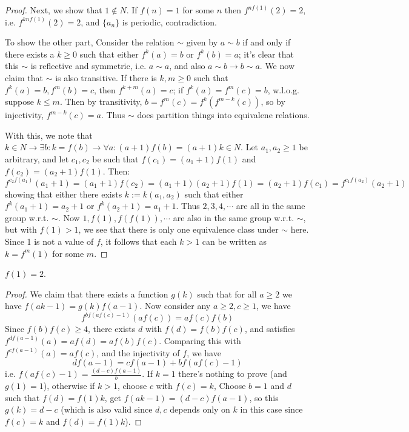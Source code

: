 \documentclass[11pt,a4paper]{article}
\begin{document}
\begin{enumerate}
    	\begin{proof}
    		Next, we show that $1\not\in N$. 
    		If $f(n)=1$ for some $n$ then $f^{nf(1)}(2)=2$, 
    		i.e. $f^{knf(1)}(2)=2$, and $\{a_n\}$ is periodic, contradiction. 
    		
    		To show the other part, 
    		Consider the relation $\sim$ given by $a\sim b$ if and only if there exists a $k\ge 0$ such that either $f^k(a)=b$ or $f^k(b) = a$; 
    		it's clear that this $\sim$ is reflective and symmetric, 
    		i.e. $a\sim a$, and also $a\sim b\to b\sim a$. 
    		We now claim that $\sim$ is also transitive. 
    		If there is $k, m\ge 0$ such that $f^k(a)=b, f^m(b)=c$, 
    		then $f^{k+m}(a)=c$; 
    		if $f^k(a)=f^m(c)=b$, 
    		w.l.o.g. suppose $k\le m$. 
    		Then by transitivity, $b = f^m(c)=f^{k}(f^{m-k}(c))$, 
    		so by injectivity, $f^{m-k}(c) = a$. 
    		Thus $\sim$ does partition things into equivalene relations. 
    		
    		With this, we note that $k\in N\to \exists b: k=f(b) 
    		\to \forall a: (a+1)f(b)=(a+1)k\in N$. 
    		Let $a_1, a_2\ge 1$ be arbitrary, and let $c_1, c_2$ be such that 
    		$f(c_1)=(a_1+1)f(1)$ and $f(c_2)=(a_2+1)f(1)$. 
    		Then: 
    		\[
    		f^{c_2f(a_1)}(a_1+1) = (a_1+1)f(c_2)=(a_1+1)(a_2+1)f(1)
    		=(a_2+1)f(c_1)=f^{c_1f(a_2)}(a_2+1)
    		\]
    		showing that either there exists $k := k(a_1, a_2)$ such that either $f^k(a_1+1)=a_2+1$ or $f^k(a_2+1)=a_1+1$. 
    		Thus $2, 3, 4, \cdots$ are all in the same group w.r.t. $\sim$. 
    		Now $1, f(1), f(f(1)), \cdots$ are also in the same group w.r.t. $\sim$, 
    		but with $f(1) > 1$, 
    		we see that there is only one equivalence class under $\sim$ here. 
    		Since 1 is not a value of $f$, 
    		it follows that each $k > 1$ can be written as $k = f^m(1)$ for some $m$. 
    	\end{proof}
    	
    	\begin{lemma}
    		$f(1) = 2$. 
    	\end{lemma}
    	
    	\begin{proof}
    		We claim that there exists a function $g(k)$ such that for all $a\ge 2$ we have $f(ak - 1) = g(k)f(a - 1)$. 
    		Now consider any $a\ge 2, c\ge 1$, we have 
    		\[
    		f^{bf(af(c) - 1)}(af(c))
    		=af(c)f(b)
    		\]
    		Since $f(b)f(c)\ge 4$, 
    		there exists $d$ with $f(d)=f(b)f(c)$, 
    		and satisfies 
    		$f^{df(a - 1)}(a) = af(d)=af(b)f(c)$. 
    		Comparing this with $f^{cf(a-1)}(a)=af(c)$, 
    		and the injectivity of $f$, we have 
    		\[
    		df(a - 1) = cf(a - 1) + bf(af(c) - 1)
    		\]
    		i.e. $f(af(c) - 1) = \frac{(d - c)f(a - 1)}{b}$. 
    		If $k=1$ there's nothing to prove (and $g(1)=1$), 
    		otherwise if $k > 1$, 
    		choose $c$ with $f(c)=k$, 
    		Choose $b = 1$ and $d$ such that $f(d) = f(1)k$, 
    		get $f(ak - 1) = (d - c)f(a - 1)$, 
    		so this $g(k) = d - c$ (which is also valid since $d, c$ depends only on $k$ in this case since $f(c)=k$ and $f(d) = f(1)k$).
    		

\end{proof}
\end{enumerate}
\end{document}
